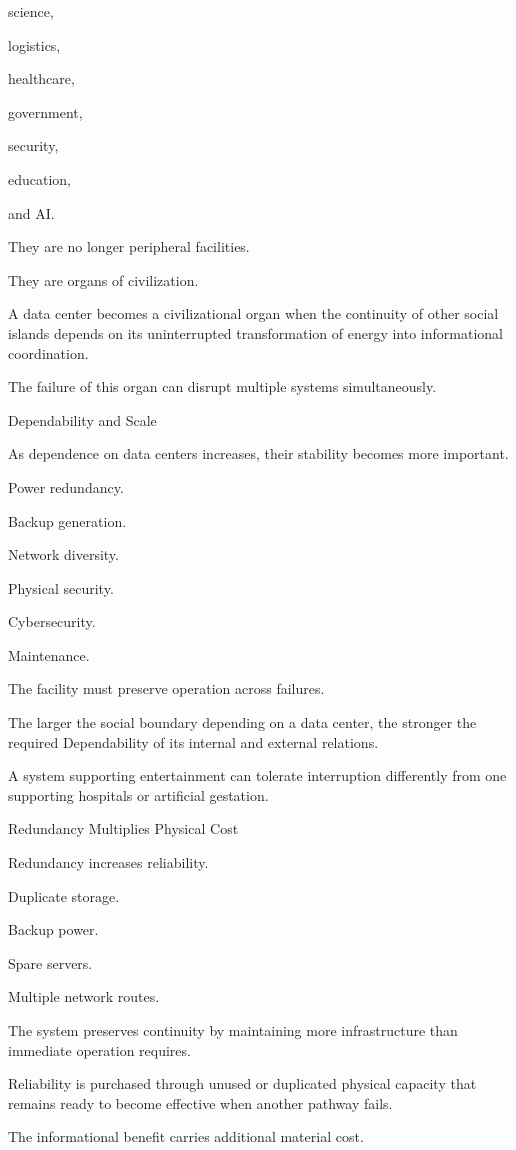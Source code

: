 science,

logistics,

healthcare,

government,

security,

education,

and AI.

They are no longer peripheral facilities.

They are organs of civilization.

A data center becomes a civilizational organ when the continuity of other social islands depends on its uninterrupted transformation of energy into informational coordination.

The failure of this organ can disrupt multiple systems simultaneously.

Dependability and Scale

As dependence on data centers increases, their stability becomes more important.

Power redundancy.

Backup generation.

Network diversity.

Physical security.

Cybersecurity.

Maintenance.

The facility must preserve operation across failures.

The larger the social boundary depending on a data center, the stronger the required Dependability of its internal and external relations.

A system supporting entertainment can tolerate interruption differently from one supporting hospitals or artificial gestation.

Redundancy Multiplies Physical Cost

Redundancy increases reliability.

Duplicate storage.

Backup power.

Spare servers.

Multiple network routes.

The system preserves continuity by maintaining more infrastructure than immediate operation requires.

Reliability is purchased through unused or duplicated physical capacity that remains ready to become effective when another pathway fails.

The informational benefit carries additional material cost.

